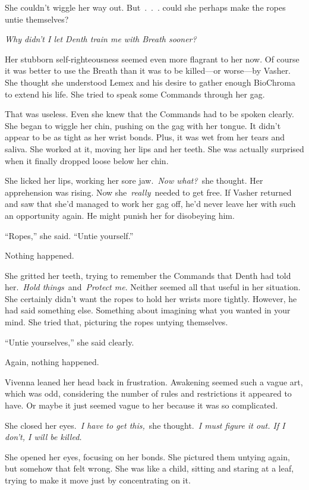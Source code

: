 She couldn’t wiggle her way out. But~.~.~. could she perhaps make the ropes untie themselves?

\textit{Why didn’t I let Denth train me with Breath sooner?}

Her stubborn self-righteousness seemed even more flagrant to her now. Of course it was better to use the Breath than it was to be killed—or worse—by Vasher. She thought she understood Lemex and his desire to gather enough BioChroma to extend his life. She tried to speak some Commands through her gag.

That was useless. Even she knew that the Commands had to be spoken clearly. She began to wiggle her chin, pushing on the gag with her tongue. It didn’t appear to be as tight as her wrist bonds. Plus, it was wet from her tears and saliva. She worked at it, moving her lips and her teeth. She was actually surprised when it finally dropped loose below her chin.

She licked her lips, working her sore jaw.~\textit{Now what?}~she thought. Her apprehension was rising. Now she~\textit{really}~needed to get free. If Vasher returned and saw that she’d managed to work her gag off, he’d never leave her with such an opportunity again. He might punish her for disobeying him.

“Ropes,” she said. “Untie yourself.”

Nothing happened.

She gritted her teeth, trying to remember the Commands that Denth had told her.~\textit{Hold things}~and~\textit{Protect me}. Neither seemed all that useful in her situation. She certainly didn’t want the ropes to hold her wrists more tightly. However, he had said something else. Something about imagining what you wanted in your mind. She tried that, picturing the ropes untying themselves.

“Untie yourselves,” she said clearly.

Again, nothing happened.

Vivenna leaned her head back in frustration. Awakening seemed such a vague art, which was odd, considering the number of rules and restrictions it appeared to have. Or maybe it just seemed vague to her because it was so complicated.

She closed her eyes.~\textit{I have to get this,}~she thought.~\textit{I must figure it out. If I don’t, I will be killed.}

She opened her eyes, focusing on her bonds. She pictured them untying again, but somehow that felt wrong. She was like a child, sitting and staring at a leaf, trying to make it move just by concentrating on it.

